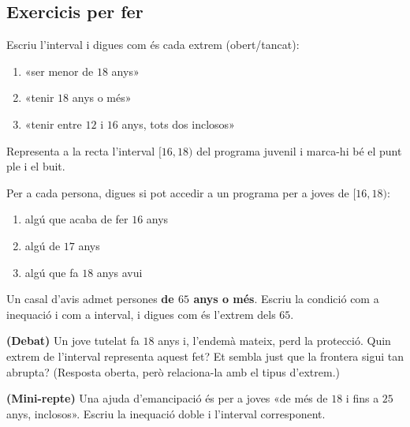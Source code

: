 \subsection{Exercicis per fer}

\begin{exercicis}
\begin{exlist}
  \item Escriu l'interval i digues com és cada extrem (obert/tancat):
        \begin{enumerate}[label=\alph*), leftmargin=1.6em, topsep=2pt]
          \item «ser menor de $18$ anys»
          \item «tenir $18$ anys o més»
          \item «tenir entre $12$ i $16$ anys, tots dos inclosos»
        \end{enumerate}
  \item Representa a la recta l'interval $[16,18)$ del programa juvenil i marca-hi bé
        el punt ple i el buit.
  \item Per a cada persona, digues si pot accedir a un programa per a joves de
        $[16,18)$:
        \begin{enumerate}[label=\alph*), leftmargin=1.6em, topsep=2pt]
          \item algú que acaba de fer $16$ anys
          \item algú de $17$ anys
          \item algú que fa $18$ anys avui
        \end{enumerate}
  \item Un casal d'avis admet persones \textbf{de $65$ anys o més}. Escriu la condició
        com a inequació i com a interval, i digues com és l'extrem dels $65$.
  \item \textbf{(Debat)} Un jove tutelat fa $18$ anys i, l'endemà mateix, perd la
        protecció. Quin extrem de l'interval representa aquest fet? Et sembla just que
        la frontera sigui tan abrupta? (Resposta oberta, però relaciona-la amb el tipus
        d'extrem.)
  \item \textbf{(Mini-repte)} Una ajuda d'emancipació és per a joves «de més de $18$ i
        fins a $25$ anys, inclosos». Escriu la inequació doble i l'interval
        corresponent.
\end{exlist}
\end{exercicis}

